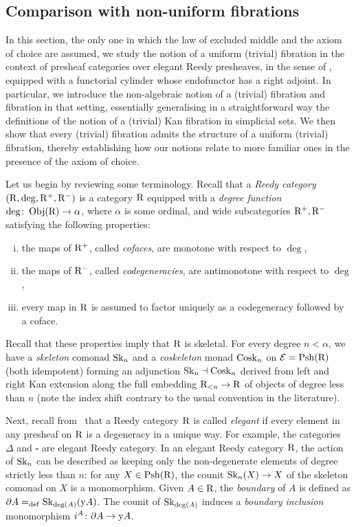 \documentclass[reqno,10pt,a4paper,oneside,draft]{amsart}
\begin{document}
\subsection*{Comparison with non-uniform fibrations}

In this section, the only one in which the law of excluded middle and the axiom of choice are assumed, we study the notion of a uniform (trivial) fibration in the context of presheaf categories over elegant Reedy presheaves, in the sense of \cite{bergner-rezk-elegant}, equipped with a functorial cylinder whose endofunctor has a right adjoint.
In particular, we introduce the non-algebraic notion of a (trivial) fibration and fibration in that setting, essentially generalising in a straightforward way the definitions of the notion of a (trivial) Kan fibration in simplicial sets.
We then show that every (trivial) fibration admits the structure of a uniform (trivial) fibration, thereby establishing how our notions relate to more familiar ones in the presence of the axiom of choice.

\medskip

Let us begin by reviewing some terminology.
Recall that a \emph{Reedy category} $(\mathrm{R}, \deg, \mathrm{R}^+, \mathrm{R}^-)$ is a category $\mathrm{R}$ equipped with a \emph{degree function} $\deg \colon \operatorname{Obj}(\mathrm{R}) \to \alpha$, where $\alpha$ is some ordinal, and wide subcategories $\mathrm{R}^+, \mathrm{R}^-$ satisfying the following properties:
\begin{enumerate}[(i)]
\item the maps of $\mathrm{R}^+$, called \emph{cofaces}, are monotone with respect to $\deg$,
\item the maps of $\mathrm{R}^-$, called \emph{codegeneracies}, are antimonotone with respect to $\deg$,
\item every map in $\mathrm{R}$ is assumed to factor uniquely as a codegeneracy followed by a coface.
\end{enumerate}
Recall that these properties imply that $\mathrm{R}$ is skeletal.
For every degree $n < \alpha$, we have a \emph{skeleton} comonad $\operatorname{Sk}_n$ and a \emph{coskeleton} monad $\operatorname{Cosk}_n$ on $\mathcal{E} = \mathrm{Psh}(\mathrm{R})$ (both idempotent) forming an adjunction $\operatorname{Sk}_n \dashv \operatorname{Cosk}_n$ derived from left and right Kan extension along the full embedding $\mathrm{R}_{<n} \to \mathrm{R}$ of objects of degree less than $n$ (note the index shift contrary to the usual convention in the literature).

\medskip

Next, recall from~\cite{bergner-rezk-elegant} that a Reedy category $\mathrm{R}$ is called \emph{elegant} if every element in any presheaf on $\mathrm{R}$ is a degeneracy in a unique way.
For example, the categories $\Delta$ and $\square$ are elegant Reedy category. 
In an elegant Reedy category $\mathrm{R}$, the action of $\operatorname{Sk}_n$ can be described as keeping only the non-degenerate elements of degree strictly less than $n$: for any $X \in \mathrm{Psh}(\mathrm{R})$, the counit $\operatorname{Sk}_n(X) \to X$ of the skeleton comonad on $X$ is a monomorphism.
Given $A \in \mathrm{R}$, the \emph{boundary} of $A$ is defined as $\partial A =_{\operatorname{def}} \operatorname{Sk}_{\deg(A)}(\mathrm{y} A)$.
The counit of $\operatorname{Sk}_{\deg(A)}$ induces a \emph{boundary inclusion} monomorphism $i^A \colon \partial A \to \mathrm{y} A$.
\end{document}

